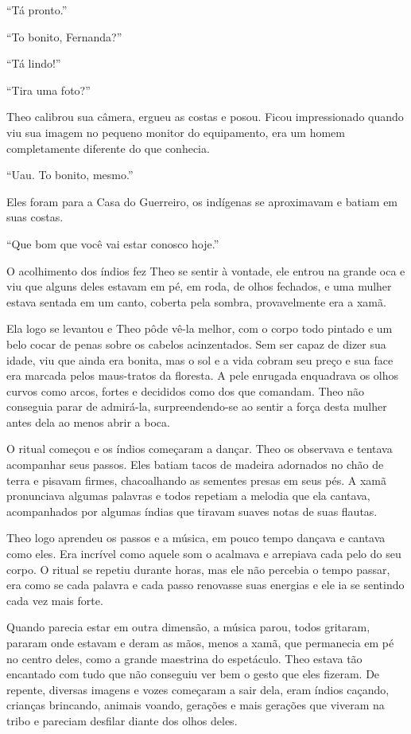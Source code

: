 ``Tá pronto.''

``To bonito, Fernanda?''

``Tá lindo!''

``Tira uma foto?''

Theo calibrou sua câmera, ergueu as costas e posou. Ficou impressionado
quando viu sua imagem no pequeno monitor do equipamento, era um homem
completamente diferente do que conhecia.

``Uau. To bonito, mesmo.''

Eles foram para a Casa do Guerreiro, os indígenas se aproximavam e
batiam em suas costas.

``Que bom que você vai estar conosco hoje.''

O acolhimento dos índios fez Theo se sentir à vontade, ele entrou na
grande oca e viu que alguns deles estavam em pé, em roda, de olhos
fechados, e uma mulher estava sentada em um canto, coberta pela sombra,
provavelmente era a xamã.

Ela logo se levantou e Theo pôde vê-la melhor, com o corpo todo pintado
e um belo cocar de penas sobre os cabelos acinzentados. Sem ser capaz de
dizer sua idade, viu que ainda era bonita, mas o sol e a vida cobram seu
preço e sua face era marcada pelos maus-tratos da floresta. A pele
enrugada enquadrava os olhos curvos como arcos, fortes e decididos como
dos que comandam. Theo não conseguia parar de admirá-la,
surpreendendo-se ao sentir a força desta mulher antes dela ao menos
abrir a boca.

O ritual começou e os índios começaram a dançar. Theo os observava e
tentava acompanhar seus passos. Eles batiam tacos de madeira adornados
no chão de terra e pisavam firmes, chacoalhando as sementes presas em
seus pés. A xamã pronunciava algumas palavras e todos repetiam a melodia
que ela cantava, acompanhados por algumas índias que tiravam suaves
notas de suas flautas.

Theo logo aprendeu os passos e a música, em pouco tempo dançava e
cantava como eles. Era incrível como aquele som o acalmava e arrepiava
cada pelo do seu corpo. O ritual se repetiu durante horas, mas ele não
percebia o tempo passar, era como se cada palavra e cada passo renovasse
suas energias e ele ia se sentindo cada vez mais forte.

Quando parecia estar em outra dimensão, a música parou, todos gritaram,
pararam onde estavam e deram as mãos, menos a xamã, que permanecia em pé
no centro deles, como a grande maestrina do espetáculo. Theo estava tão
encantado com tudo que não conseguiu ver bem o gesto que eles fizeram.
De repente, diversas imagens e vozes começaram a sair dela, eram índios
caçando, crianças brincando, animais voando, gerações e mais gerações
que viveram na tribo e pareciam desfilar diante dos olhos deles.

